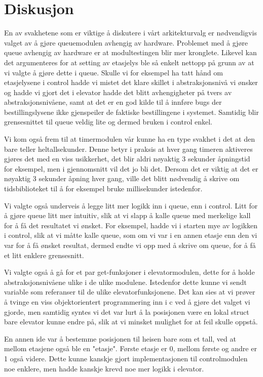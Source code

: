 \documentclass{article}
\begin{document}
\section{Diskusjon}
En av svakhetene som er viktige å diskutere i vårt arkitekturvalg er nødvendigvis valget av å gjøre queuemodulen avhengig av hardware. Problemet med å gjøre queue avhengig av hardware er at modultestingen blir mer kronglete. Likevel kan det argumenteres for at setting av etasjelys ble så enkelt nettopp på grunn av at vi valgte å gjøre dette i queue. Skulle vi for eksempel ha tatt hånd om etasjelysene i control hadde vi mistet det klare skillet i abstraksjonsnivå vi ønsker og hadde vi gjort det i elevator hadde det blitt avhengigheter på tvers av abstraksjonsnivåene, samt at det er en god kilde til å innføre bugs der bestillingslysene ikke gjenspeiler de faktiske bestillingene i systemet. Samtidig blir grensesnittet til queue veldig lite og dermed bruken i control enkel. 

Vi kom også frem til at timermodulen vår kunne ha en type svakhet i det at den bare teller heltallsekunder. Denne betyr i praksis at hver gang timeren aktiveres gjøres det med en viss usikkerhet, det blir aldri nøyaktig 3 sekunder åpningstid for eksempel, men i gjennomsnitt vil det jo bli det. Dersom det er viktig at det er nøyaktig 3 sekunder åpning hver gang, ville det blitt nødvendig å skrive om tidsbiblioteket til å for eksempel bruke millisekunder istedenfor.

Vi valgte også underveis å legge litt mer logikk inn i queue, enn i control. Litt for å gjøre queue litt mer intuitiv, slik at vi slapp å kalle queue med merkelige kall for å få det resultatet vi ønsket. For eksempel, hadde vi i starten mye av logikken i control, slik at vi måtte kalle queue, som om vi var i en annen etasje enn den vi var for å få ønsket resultat, dermed endte vi opp med å skrive om queue, for å få et litt enklere grensesnitt.

Vi valgte også å gå for et par get-funksjoner i elevatormodulen, dette for å holde abstraksjonsnivåene ulike i de ulike modulene. Istedenfor dette kunne vi sendt variable som referanser til de ulike elevatorfunksjonene. Det kan sies at vi prøver å tvinge en viss objektorientert programmering inn i c ved å gjøre det valget vi gjorde, men samtidig syntes vi det var lurt å la posisjonen være en lokal struct bare elevator kunne endre på, slik at vi minsket mulighet for at feil skulle oppstå.

En annen ide var å bestemme posisjonen til heisen bare som et tall, ved at mellom etasjene også ble en "etasje". Første etasje er 0, mellom første og andre er 1 også videre. Dette kunne kanskje gjort implementasjonen til controlmodulen noe enklere, men hadde kanskje krevd noe mer logikk i elevator.

\end{document}
